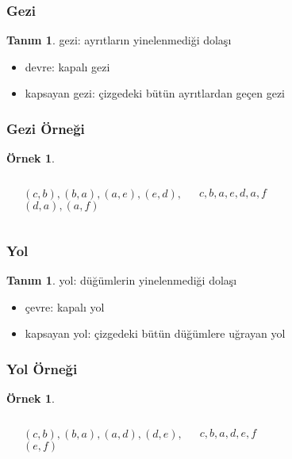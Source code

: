 \documentclass[dvipsnames]{beamer}
\theoremstyle{definition}
\newtheorem{tanim}[theorem]{Tanım}
\theoremstyle{example}
\newtheorem{ornek}[theorem]{Örnek}
\theoremstyle{plain}
\begin{document}
\begin{frame}
  \frametitle{Gezi}

  \begin{tanim}
    \alert{gezi}: ayrıtların yinelenmediği dolaşı
  \end{tanim}

  \pause
  \begin{itemize}
    \item \alert{devre}: kapalı gezi
    \item \alert{kapsayan} gezi: çizgedeki bütün ayrıtlardan geçen gezi
  \end{itemize}
\end{frame}

\begin{frame}
  \frametitle{Gezi Örneği}

  \begin{ornek}
    \begin{columns}
      \begin{center}
      \end{center}

      $(c,b),(b,a),(a,e),(e,d),$\\
      $(d,a),(a,f)$

      \medskip
      $c,b,a,e,d,a,f$
    \end{columns}
  \end{ornek}
\end{frame}

\begin{frame}
  \frametitle{Yol}

  \begin{tanim}
    \alert{yol}: düğümlerin yinelenmediği dolaşı
  \end{tanim}

  \pause
  \begin{itemize}
    \item \alert{çevre}: kapalı yol
    \item \alert{kapsayan} yol: çizgedeki bütün düğümlere uğrayan yol
  \end{itemize}
\end{frame}

\begin{frame}
  \frametitle{Yol Örneği}

  \begin{ornek}
    \begin{columns}
      \begin{center}
      \end{center}

      $(c,b),(b,a),(a,d),(d,e),$\\
      $(e,f)$

      \medskip
      $c,b,a,d,e,f$
    \end{columns}
  \end{ornek}
\end{frame}
\end{document}
